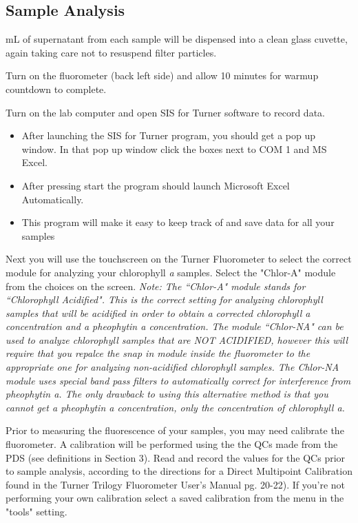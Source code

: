\documentclass[12pt]{../SOP3}\usepackage[]{graphicx}\usepackage[]{color}
\begin{document}
\subsection*{Sample Analysis}

 mL of supernatant from each sample will be dispensed into a clean glass cuvette, again taking care not to resuspend filter particles.

\NP Turn on the fluorometer (back left side) and allow 10 minutes for warmup countdown to complete. 

\NP Turn on the lab computer and open SIS for Turner software to record data. 
\begin{itemize}
\item After launching the SIS for Turner program, you should get a pop up window. In that pop up window click the boxes next to COM 1 and MS Excel.
\item After pressing start the program should launch Microsoft Excel Automatically.
\item This program will make it easy to keep track of and save data for all your samples
\end{itemize}

\NP Next you will use the touchscreen on the Turner Fluorometer to select the correct module for analyzing your chlorophyll \textit{a} samples. Select the "Chlor-A" module from the choices on the screen. {\small \textit{Note: The ``Chlor-A" module stands for ``Chlorophyll Acidified". This is the correct setting for analyzing chlorophyll samples that will be acidified in order to obtain a corrected chlorophyll a concentration and a pheophytin a concentration. The module ``Chlor-NA" can be used to analyze chlorophyll samples that are NOT ACIDIFIED, however this will require that you repalce the snap in module inside the fluorometer to the appropriate one for analyzing non-acidified chlorophyll samples. The Chlor-NA module uses special band pass filters to automatically correct for interference from pheophytin a. The only drawback to using this alternative method is that you cannot get a pheophytin a concentration, only the concentration of chlorophyll a.}}

\NP Prior to measuring the fluorescence of your samples, you may need calibrate the fluorometer. A calibration will be performed using the the QCs made from the PDS (see definitions in Section 3). Read and record the values for the QCs prior to sample analysis, according to the directions for a Direct Multipoint Calibration found in the Turner Trilogy Fluorometer User's Manual pg. 20-22). If you're not performing your own calibration select a saved calibration from the menu in the "tools" setting.
\end{document}
